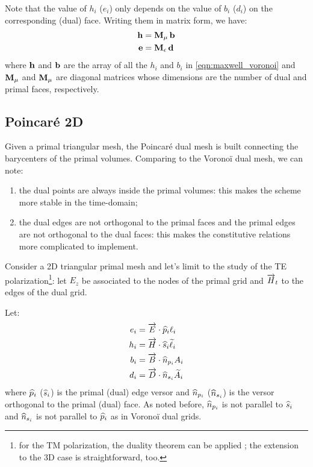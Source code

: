


Note that the value of $h_i$ ($e_i$) only depends on the value of
$b_i$ ($d_i$) on the corresponding (dual) face. Writing them in matrix
form, we have:
\begin{align*}
  \mathbf{h} & = {\mathbf{M}_\mu\,\mathbf{b}} \\
  \mathbf{e} & = {\mathbf{M}_\epsilon\,\mathbf{d}}
\end{align*}
where $\mathbf{h}$ and $\mathbf{b}$ are the array of all the $h_i$ and
$b_i$ in \eqref{eqn:maxwell_voronoi} and $\mathbf{M}_\mu$ and
$\mathbf{M}_\mu$ are diagonal matrices whose dimensions are the number
of dual and primal faces, respectively.

\subsection{Poincar\'e 2D} \label{sec:poicare}

Given a primal triangular mesh, the Poincar\'e dual mesh is built
connecting the barycenters of the primal volumes. Comparing to the
Vorono\"i dual mesh, we can note:
\begin{enumerate}
\item
  the dual points are always inside the primal volumes: this makes the
  scheme more stable in the time-domain;
\item
  the dual edges are not orthogonal to the primal faces and the primal
  edges are not orthogonal to the dual faces: this makes the
  constitutive relations more complicated to implement.
\end{enumerate}

Consider a 2D triangular primal mesh and let's limit to the study of
the TE polarization\footnote{for the TM polarization, the duality
  theorem can be applied ; the
  extension to the 3D case is straightforward, too.}: let $E_z$ be
associated to the nodes of the primal grid and $\overrightarrow{H}_t$ to the edges of
the dual grid.


Let:
\begin{align} \label{eqn:dof_poincare}
e_i & = {\overrightarrow{E} \cdot \widehat{p}_i} \ell_i \\
h_i & = {\overrightarrow{H} \cdot \widehat{s}_i} \widetilde{\ell}_i \\
b_i & = {\overrightarrow{B} \cdot \widehat{n}_{p_i}} A_i \\
d_i & = {\overrightarrow{D} \cdot \widehat{n}_{s_i}} \widetilde{A}_i
\end{align}
where $\widehat{p}_i$ ($\widehat{s}_i$) is the primal (dual) edge
versor and $\widehat{n}_{p_i}$ ($\widehat{n}_{s_i}$) is the versor
orthogonal to the primal (dual) face. As noted before,
$\widehat{n}_{p_i}$ is not parallel to $\widehat{s}_i$ and
$\widehat{n}_{s_i}$ is not parallel to $\widehat{p}_i$ as in
Vorono\"i dual grids.

